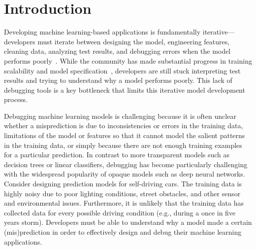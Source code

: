 \section{Introduction}\label{intro}
Developing machine learning-based applications is fundamentally iterative---developers must iterate between designing the model, engineering features, cleaning data, analyzing test results, and debugging errors when the model performs poorly~\cite{sculley2014machine, krishnan2016hilda}.
While the community has made substantial progress in training scalability and model specification~\cite{hellerstein2012madlib,tensor, kraska2013mlbase, crotty2014tupleware, keystone}, developers are still stuck interpreting test results and trying to understand why a model performs poorly.  This lack of debugging tools is a key bottleneck that limits this iterative model development process.

Debugging machine learning models is challenging because it is often unclear whether a misprediction is due to 
inconsistencies or errors in the training data, 
limitations of the model or features so that it cannot model the salient patterns in the training data,
or simply because there are not enough training examples for a particular prediction. 
In contrast to more transparent models such as decision trees or linear classifiers, debugging has become particularly challenging with the widespread popularity of opaque models such as deep neural networks.
Consider designing prediction models for self-driving cars.
The training data is highly noisy due to poor lighting conditions, street obstacles, and other sensor and environmental issues.
Furthermore, it is unlikely that the training data has collected data for every possible driving condition (e.g., during a once in five years storm).
Developers must be able to understand why a model made a certain (mis)prediction in order to effectively design and debug their machine learning applications.


